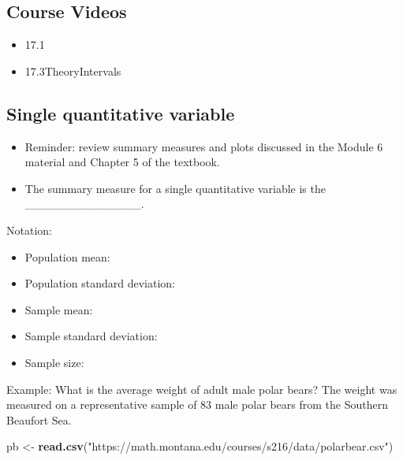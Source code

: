 \documentclass[
]{report}
\newenvironment{Shaded}{\begin{snugshade}}{\end{snugshade}}
\newcommand{\FunctionTok}[1]{\textcolor[rgb]{0.13,0.29,0.53}{\textbf{#1}}}
\newcommand{\NormalTok}[1]{#1}
\newcommand{\OtherTok}[1]{\textcolor[rgb]{0.56,0.35,0.01}{#1}}
\newcommand{\StringTok}[1]{\textcolor[rgb]{0.31,0.60,0.02}{#1}}
\begin{document}
\subsection{Course Videos}\label{course-videos-5}

\begin{itemize}
\item
  17.1
\item
  17.3TheoryIntervals
\end{itemize}


\subsection{Single quantitative variable}\label{single-quantitative-variable}

\begin{itemize}
\item
  Reminder: review summary measures and plots discussed in the Module 6 material and Chapter 5 of the textbook.
\item
  The summary measure for a single quantitative variable is the \_\_\_\_\_\_\_\_\_\_\_\_\_\_.
\end{itemize}


Notation:

\begin{itemize}
\item
  Population mean:
\item
  Population standard deviation:
\item
  Sample mean:
\item
  Sample standard deviation:
\item
  Sample size:
\end{itemize}


Example: What is the average weight of adult male polar bears? The weight was measured on a representative sample of 83 male polar bears from the Southern Beaufort Sea.

\begin{Shaded}
\begin{Highlighting}[]
\NormalTok{pb }\OtherTok{\textless{}{-}} \FunctionTok{read.csv}\NormalTok{(}\StringTok{"https://math.montana.edu/courses/s216/data/polarbear.csv"}\NormalTok{)}
\end{Highlighting}
\end{Shaded}
\end{document}
